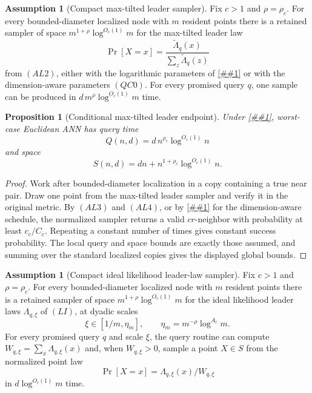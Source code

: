 \documentclass[10pt]{article}
\newcommand{\cref}[1]{\ref{##1}}
\newtheorem{proposition}[theorem]{Proposition}
\theoremstyle{definition}
\newtheorem{assumption}[theorem]{Assumption}
\begin{document}
\begin{assumption}[Compact max-tilted leader sampler]
   \label{asm:alpha-leader-sampler}
   Fix \(c>1\) and \(\rho=\rho_c\).  For every bounded-diameter localized node
   with \(m\) resident points there is a retained sampler of space
   \(m^{1+\rho}\log^{O_c(1)}m\) for the max-tilted leader law
   \[
      \Pr[X=x]
      =
      \frac{\widetilde\Lambda_q(x)}
           {\sum_z\widetilde\Lambda_q(z)}
   \]
   from \((AL2)\), either with the logarithmic parameters of
   \cref{lem:scale-amplified-alpha-leader} or with the dimension-aware
   parameters \((QC0)\).  For every promised query \(q\), one sample can be
   produced in
   \(d\,m^\rho\log^{O_c(1)}m\) time.
\end{assumption}

\begin{proposition}[Conditional max-tilted leader endpoint]
   \label{prop:alpha-leader-polylog}
   Under \cref{asm:alpha-leader-sampler}, worst-case Euclidean ANN has query
   time
   \[
      Q(n,d)=d\,n^{\rho_c}\log^{O_c(1)}n
   \]
   and space
   \[
      S(n,d)=dn+n^{1+\rho_c}\log^{O_c(1)}n .
   \]
\end{proposition}

\begin{proof}
   Work after bounded-diameter localization in a copy containing a true near
   pair.  Draw one point from the max-tilted leader sampler and verify it in
   the original metric.  By \((AL3)\) and \((AL4)\), or by
   \cref{cor:query-centered-cell-reweighting} for the dimension-aware schedule,
   the normalized sampler returns a valid \(cr\)-neighbor with probability at
   least \(c_c/C_c\).
   Repeating a constant number of times gives constant success probability.
   The local query and space bounds are exactly those assumed, and summing
   over the standard localized copies gives the displayed global bounds.
\end{proof}

\begin{assumption}[Compact ideal likelihood leader-law sampler]
   \label{asm:ideal-likelihood-leader-law-sampler}
   Fix \(c>1\) and \(\rho=\rho_c\).  For every bounded-diameter localized node
   with \(m\) resident points there is a retained sampler of space
   \(m^{1+\rho}\log^{O_c(1)}m\) for the ideal likelihood leader laws
   \(\Lambda_{q,\xi}\) of \((LI)\), at dyadic scales
   \[
      \xi\in[1/m,\eta_m],
      \qquad
      \eta_m=m^{-\rho}\log^{A_c}m .
   \]
   For every promised query \(q\) and scale \(\xi\), the query routine can
   compute \(W_{q,\xi}=\sum_x\Lambda_{q,\xi}(x)\) and, when \(W_{q,\xi}>0\),
   sample a point \(X\in S\) from the normalized point law
   \[
      \Pr[X=x]=\Lambda_{q,\xi}(x)/W_{q,\xi}
   \]
   in \(d\log^{O_c(1)}m\) time.
\end{assumption}
\end{document}
